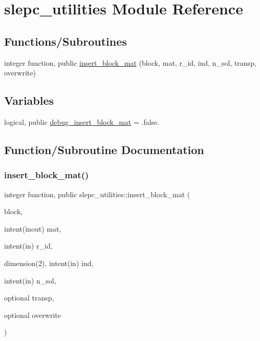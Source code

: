 \hypertarget{namespaceslepc__utilities}{}\section{slepc\+\_\+utilities Module Reference}
\label{namespaceslepc__utilities}
\subsection*{Functions/\+Subroutines}
\begin{DoxyCompactItemize}
\item 
integer function, public \hyperlink{namespaceslepc__utilities_ae6568f825f3fa8a6e3d45f67f3daf412}{insert\+\_\+block\+\_\+mat} (block, mat, r\+\_\+id, ind, n\+\_\+sol, transp, overwrite)
\end{DoxyCompactItemize}
\subsection*{Variables}
\begin{DoxyCompactItemize}
\item 
logical, public \hyperlink{namespaceslepc__utilities_a5cb92553633cb22ff703286298862ac7}{debug\+\_\+insert\+\_\+block\+\_\+mat} = .false.
\end{DoxyCompactItemize}


\subsection{Function/\+Subroutine Documentation}
\mbox{\label{namespaceslepc__utilities_ae6568f825f3fa8a6e3d45f67f3daf412}} 
\subsubsection{\texorpdfstring{insert\+\_\+block\+\_\+mat()}{insert\_block\_mat()}}
{\footnotesize\ttfamily integer function, public slepc\+\_\+utilities\+::insert\+\_\+block\+\_\+mat (\begin{DoxyParamCaption}\item[{}]{block,  }\item[{intent(inout)}]{mat,  }\item[{intent(in)}]{r\+\_\+id,  }\item[{dimension(2), intent(in)}]{ind,  }\item[{intent(in)}]{n\+\_\+sol,  }\item[{optional}]{transp,  }\item[{optional}]{overwrite }\end{DoxyParamCaption})}



